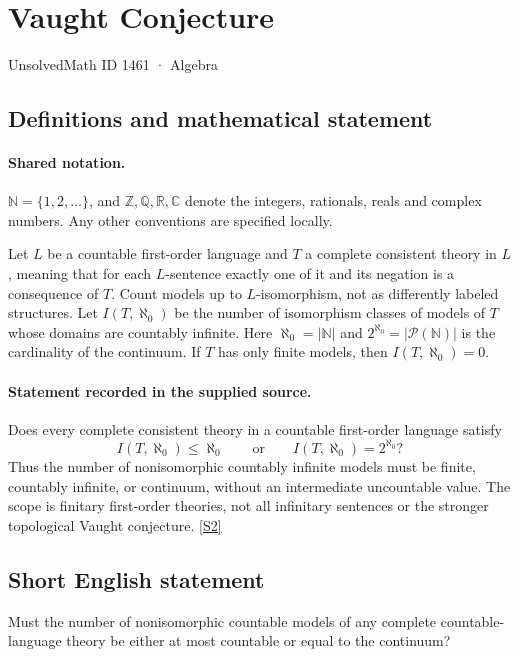 \documentclass[11pt]{article}
\newcommand{\sref}[2]{\hyperlink{source:#1:#2}{[S#2]}}
\begin{document}
\setcounter{section}{1460}
\section{Vaught Conjecture}\label{1461}
{\small\sffamily UnsolvedMath ID 1461 · Algebra}
\subsection{Definitions and mathematical statement}

\paragraph{Shared notation.}$\mathbb N=\{1,2,\ldots\}$, and $\mathbb Z,\mathbb Q,\mathbb R,\mathbb C$ denote the integers, rationals, reals and complex numbers. Any other conventions are specified locally.


Let $L$ be a countable first-order language and $T$ a complete consistent theory in $L$, meaning that for each $L$-sentence exactly one of it and its negation is a consequence of $T$. Count models up to $L$-isomorphism, not as differently labeled structures. Let $I(T,\aleph_0)$ be the number of isomorphism classes of models of $T$ whose domains are countably infinite. Here $\aleph_0=|\mathbb N|$ and $2^{\aleph_0}=|\mathcal P(\mathbb N)|$ is the cardinality of the continuum. If $T$ has only finite models, then $I(T,\aleph_0)=0$.
\paragraph{Statement recorded in the supplied source.}
Does every complete consistent theory in a countable first-order language satisfy
\[
 I(T,\aleph_0)\le\aleph_0\qquad\text{or}\qquad I(T,\aleph_0)=2^{\aleph_0}?
\]
Thus the number of nonisomorphic countably infinite models must be finite, countably infinite, or continuum, without an intermediate uncountable value. The scope is finitary first-order theories, not all infinitary sentences or the stronger topological Vaught conjecture. \sref{1461}{2}
\subsection{Short English statement}
Must the number of nonisomorphic countable models of any complete countable-language theory be either at most countable or equal to the continuum?
\end{document}
